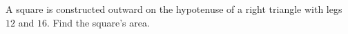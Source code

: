 A square is constructed outward on the hypotenuse of a right triangle with legs $12$ and $16$. Find the square's area.
